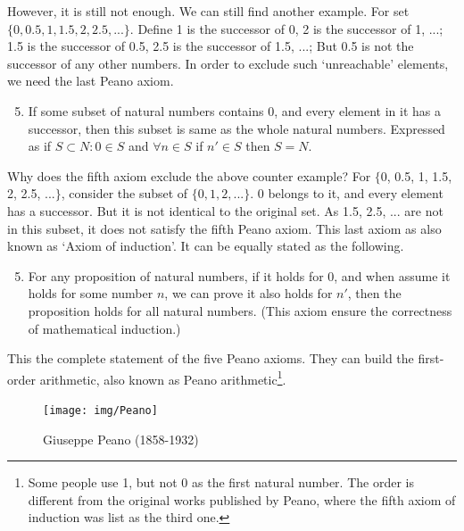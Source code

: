 \documentclass[b5paper]{article}
\begin{document}
However, it is still not enough. We can still find another example. For set $\{0, 0.5, 1, 1.5, 2, 2.5, ...\}$. Define 1 is the successor of 0, 2 is the successor of 1, ...; 1.5 is the successor of 0.5, 2.5 is the successor of 1.5, ...; But 0.5 is not the successor of any other numbers. In order to exclude such `unreachable' elements, we need the last Peano axiom.

\begin{enumerate}
  \setcounter{enumi}{4}
  \item If some subset of natural numbers contains 0, and every element in it has a successor, then this subset is same as the whole natural numbers. Expressed as if $S \subset N: 0 \in S$ and $\forall n \in S$ if $n' \in S$ then $S = N$.
\end{enumerate}

Why does the fifth axiom exclude the above counter example? For $\{$0, 0.5, 1, 1.5, 2, 2.5, ...$\}$, consider the subset of $\{0, 1, 2, ...\}$. 0 belongs to it, and every element has a successor. But it is not identical to the original set. As 1.5, 2.5, ... are not in this subset, it does not satisfy the fifth Peano axiom. This last axiom as also known as `Axiom of induction'. It can be equally stated as the following.

\begin{enumerate}
  \setcounter{enumi}{4}
  \item For any proposition of natural numbers, if it holds for 0, and when assume it holds for some number $n$, we can prove it also holds for $n'$, then the proposition holds for all natural numbers. (This axiom ensure the correctness of mathematical induction.)
\end{enumerate}

This the complete statement of the five Peano axioms. They can build the first-order arithmetic, also known as Peano arithmetic\footnote{Some people use 1, but not 0 as the first natural number. The order is different from the original works published by Peano, where the fifth axiom of induction was list as the third one.}.

\begin{figure}[htbp]
 \centering
 \texttt{[image: img/Peano]}
 \caption{Giuseppe Peano (1858-1932)}
 \label{fig:Peano}
\end{figure}
\end{document}
